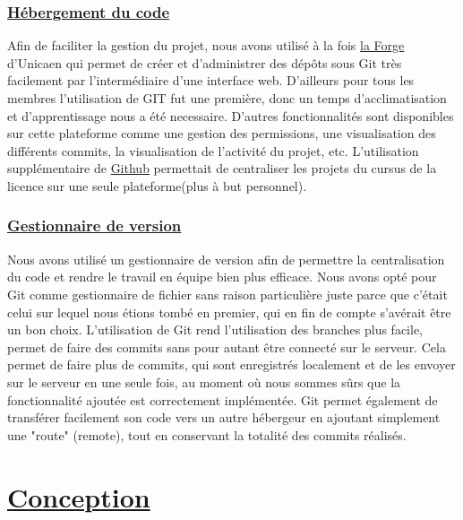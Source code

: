 \documentclass[12pt]{article}
\begin{document}
\subsubsection{\underline{Hébergement du code}}

	Afin de faciliter la gestion du projet, nous avons utilisé à la fois \href{https://forge.info.unicaen.fr/}{la Forge} d’Unicaen 
	qui permet de créer et d’administrer des dépôts sous Git très facilement par l’intermédiaire 
	d’une interface web. D'ailleurs pour tous les membres l'utilisation de GIT fut une première, donc un temps d'acclimatisation et d'apprentissage nous
	a été necessaire.
	D’autres fonctionnalités sont disponibles  sur cette plateforme comme une gestion des permissions, une visualisation 
	des différents commits, la visualisation de l’activité du projet, etc. L'utilisation supplémentaire de \href{https://github.com/}{Github} 
	permettait de centraliser les projets du cursus de la licence sur une seule plateforme(plus à but personnel).
	
\subsubsection{\underline{Gestionnaire de version}}

	Nous avons utilisé un gestionnaire de version afin de permettre la centralisation du code et rendre le travail en équipe bien 
	plus efficace. Nous avons opté pour Git comme gestionnaire de fichier sans raison particulière juste parce que c'était celui sur 
	lequel nous étions tombé en premier, qui en fin de compte s'avérait être un bon choix.
	L'utilisation de Git rend l'utilisation des branches plus facile, permet de faire des commits sans pour autant être connecté sur le serveur. 
	Cela permet de faire plus de commits, qui sont enregistrés localement et de les envoyer sur le serveur en une seule fois, 
	au moment où nous sommes sûrs que la fonctionnalité ajoutée est correctement implémentée. Git permet également de transférer facilement 
	son code vers un autre hébergeur en ajoutant simplement une "route" (remote), tout en conservant la totalité des commits réalisés.

\section{\underline{Conception}}
\end{document}
